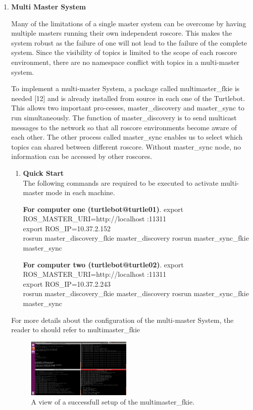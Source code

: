 \documentclass[journal]{IEEEtran}
\begin{document}
\begin{enumerate}
\begin{enumerate}
\item \textbf {Multi Master System}

Many of the limitations of a single master system can
be overcome by having multiple masters running their own
independent roscore. This makes
the system robust as the failure of one will not lead to the
failure of the complete system. Since the visibility of topics is
limited to the scope of each roscore environment, there are
no namespace conflict with topics in a multi-master system.

To implement a multi-master System, a package called
multimaster{\_}fkie is needed [12] and is already installed from source in each one of the Turtlebot. This allows two important pro-cesses, master{\_}discovery and master{\_}sync to run
simultaneously. The function of master{\_}discovery is to
send multicast messages to the network so that all roscore
environments become aware of each other. The other process called master{\_}sync enables us to select which topics can shared between different roscore. Without master{\_}sync node, no information can be accessed by other roscores. 

\begin{enumerate}
\item \textbf {Quick Start}\\
The following commands are required to be executed to activate multi-master mode in each machine.

\textbf{For computer one (turtlebot@turtle01)}.
export ROS{\_}MASTER{\_}URI=http://localhost :11311\\
export ROS{\_}IP=10.37.2.152\\
rosrun master{\_}discovery{\_}fkie master{\_}discovery
rosrun master{\_}sync{\_}fkie master{\_}sync



\textbf{For computer two (turtlebot@turtle02)}.
export ROS{\_}MASTER{\_}URI=http://localhost :11311\\
export ROS{\_}IP=10.37.2.243\\
rosrun master{\_}discovery{\_}fkie master{\_}discovery
rosrun master{\_}sync{\_}fkie master{\_}sync
\end{enumerate}
For more details about the configuration of the multi-master System, the reader to should refer to multimaster{\_}fkie\cite{temp11}

\begin{figure}[!h]
\begin{center}
\includegraphics[width=2in]{5.png}
\caption{A view of a successfull setup of the multimaster{\_}fkie.}
\end{center}
\label{fig:mypicture4}
\end{figure}



\end{enumerate}
\end{enumerate}
\end{document}
